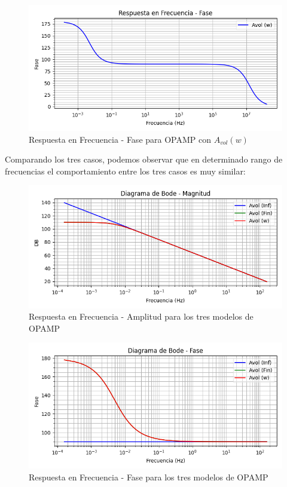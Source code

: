\begin{figure}[H]
    \centering 
    \includegraphics [scale=0.6] {../Ejercicio3-CircuitoIntegradoresyDerivadores/Imagenes/teorico-avol-w-integrador-fase.png} 
    \caption{Respuesta en Frecuencia - Fase para OPAMP con $A_{vol}(w)$ }
    \label{fig:emptyPlotTool}
\end{figure}

Comparando los tres casos, podemos observar que en determinado rango de frecuencias el comportamiento entre los tres casos es muy similar:


\begin{figure}[H]
    \centering 
    \includegraphics [scale=0.6] {../Ejercicio3-CircuitoIntegradoresyDerivadores/Imagenes/comparativo-magnitud.png} 
    \caption{Respuesta en Frecuencia - Amplitud para los tres modelos de OPAMP }
    \label{fig:emptyPlotTool}
\end{figure}

\begin{figure}[H]
    \centering 
    \includegraphics [scale=0.6] {../Ejercicio3-CircuitoIntegradoresyDerivadores/Imagenes/comparativo-fase.png} 
    \caption{Respuesta en Frecuencia - Fase para los tres modelos de OPAMP }
    \label{fig:emptyPlotTool}
\end{figure}

